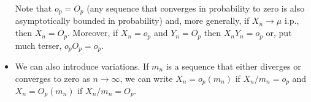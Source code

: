 \begin{itemize}[leftmargin=0pt]
  Note that $o_p = O_p$ (any sequence that converges in probability to
  zero is also asymptotically bounded in probability) and, more
  generally, if $X_n \to \mu$ i.p., then $X_n = O_p$.  Moreover, if $X_n =
  o_p$ and $Y_n = O_p$ then $X_n Y_n = o_p$ or, put much terser, $o_p
  O_p = o_p$.

\item We can also introduce variations.  If $m_n$ is a sequence that
  either diverges or converges to zero as $n \to \infty$, we can write $X_n =
  o_p(m_n)$ if $X_n / m_n = o_p$ and $X_n = O_p(m_n)$ if $X_n / m_n =
  O_p$.

\end{itemize}

